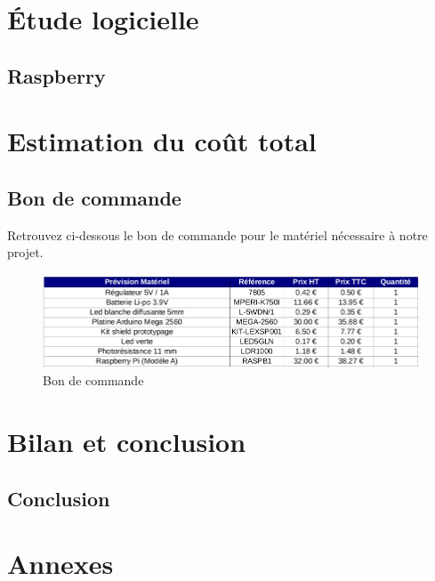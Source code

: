 \documentclass[12pt,titlepage,a4paper]{report}
\begin{document}
	\part{Étude logicielle}
	\chapter{Raspberry}
	\minitoc
	


	\part{Estimation du coût total}
	\chapter{Bon de commande}
	Retrouvez ci-dessous le bon de commande pour le matériel nécessaire à notre projet.
	\begin{figure}[h]
		\centering
		\includegraphics[width=550px]{images/lextronic.png}
		\caption{Bon de commande}
	\end{figure}


	\part{Bilan et conclusion}
	\chapter{Conclusion}
	


	\part{Annexes}
\end{document}
